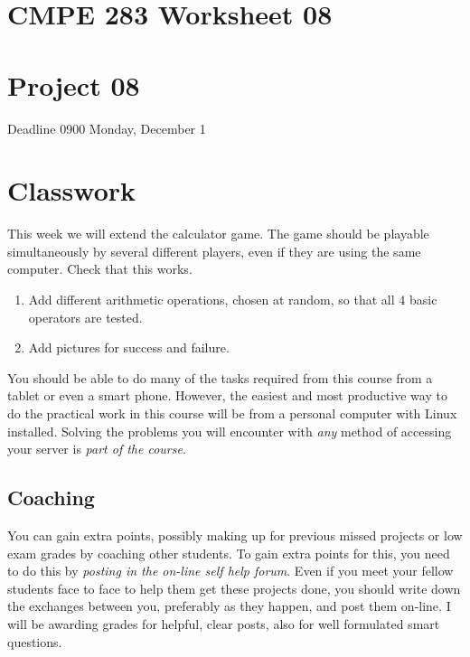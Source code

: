 \documentclass[12pt, a4paper]{article}
\begin{document}

\section*{CMPE 283 Worksheet 08}
\section*{Project 08} 
Deadline 0900 Monday, December 1


\section*{Classwork}

This week we will extend the calculator game. The game should be playable simultaneously by several different players, even if they are using the same computer. Check that this works.

\begin{enumerate}
 \item Add different arithmetic operations, chosen at random, so that all 4 basic operators are tested.
 \item Add pictures for success and failure.
\end{enumerate}

You should be able to do many of the tasks required from this course from a tablet or even a smart phone. However, the easiest and most productive way to do the practical work in this course will be from a personal computer with Linux installed. Solving the problems you will encounter with \emph{any} method of accessing your server is \emph{part of the course}.

\subsection*{Coaching}

You can gain extra points, possibly making up for previous missed projects or low exam grades by coaching other students. To gain extra points for this, you need to do this by \emph{posting in the on-line self help forum}. Even if you meet your fellow students face to face to help them get these projects done, you should write down the exchanges between you, preferably as they happen, and post them on-line. I will be awarding grades for helpful, clear posts, also for well formulated smart questions. 
\end{document}
